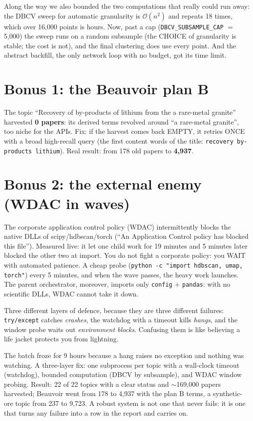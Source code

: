 \documentclass[11pt,a4paper]{article}
\begin{document}
Along the way we also bounded the two computations that really could run away: the DBCV sweep
for automatic granularity is $\mathcal{O}(n^2)$ and repeats 18 times, which over 16,000 points
is hours. Now, past a cap (\texttt{DBCV\_SUBSAMPLE\_CAP} $=$ 5,000) the sweep runs on a random
subsample (the CHOICE of granularity is stable; the cost is not), and the final clustering does
use every point. And the abstract backfill, the only network loop with no budget, got its time
limit.

\section{Bonus 1: the Beauvoir plan B}

The topic ``Recovery of by-products of lithium from the a rare-metal granite'' harvested \textbf{0
papers}: its derived terms revolved around ``a rare-metal granite'', too niche for the APIs. Fix: if
the harvest comes back EMPTY, it retries ONCE with a broad high-recall query (the first content
words of the title: \texttt{recovery by-products lithium}). Real result: from 178 old papers to
\textbf{4,937}.

\section{Bonus 2: the external enemy (WDAC in waves)}

The corporate application control policy (WDAC) intermittently blocks the native DLLs of
scipy/hdbscan/torch (``An Application Control policy has blocked this file''). Measured live: it
let one child work for 19 minutes and 5 minutes later blocked the other two at import. You do
not fight a corporate policy: you WAIT with automated patience. A cheap probe
(\texttt{python -c "import hdbscan, umap, torch"}) every 5 minutes, and when the wave passes,
the heavy work launches. The parent orchestrator, moreover, imports only \texttt{config} $+$
\texttt{pandas}: with no scientific DLLs, WDAC cannot take it down.

\begin{ojo}
Three different layers of defence, because they are three different failures:
\texttt{try/except} catches \emph{crashes}, the watchdog with a timeout kills \emph{hangs}, and
the window probe waits out \emph{environment blocks}. Confusing them is like believing a life
jacket protects you from lightning.
\end{ojo}

\begin{resumen}
The batch froze for 9 hours because a hang raises no exception and nothing was watching. A
three-layer fix: one subprocess per topic with a wall-clock timeout (watchdog), bounded
computation (DBCV by subsample), and WDAC window probing. Result: 22 of 22 topics with a clear
status and $\sim$169,000 papers harvested; Beauvoir went from 178 to 4,937 with the plan B
terms, a synthetic-ore topic from 237 to 9,723. A robust system is not one that never fails: it is one that
turns any failure into a row in the report and carries on.
\end{resumen}
\end{document}
